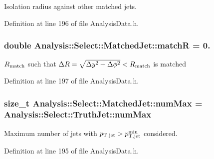 Isolation radius against other matched jets. 



Definition at line 196 of file Analysis\+Data.\+h.

\subsubsection[{\texorpdfstring{matchR}{matchR}}]{\setlength{\rightskip}{0pt plus 5cm}double Analysis\+::\+Select\+::\+Matched\+Jet\+::matchR = 0.\hspace{0.3cm}{\ttfamily [static]}}\hypertarget{namespaceAnalysis_1_1Select_1_1MatchedJet_ad59f2cab2bdc032b32b4ce0321ecfbb1}{}\label{namespaceAnalysis_1_1Select_1_1MatchedJet_ad59f2cab2bdc032b32b4ce0321ecfbb1}


$ R_{\rm match} $ such that $ \Delta R = \sqrt{\Delta y^{2}+\Delta\phi^{2}} < R_{\rm match} $ is matched 



Definition at line 197 of file Analysis\+Data.\+h.

\subsubsection[{\texorpdfstring{num\+Max}{numMax}}]{\setlength{\rightskip}{0pt plus 5cm}size\+\_\+t Analysis\+::\+Select\+::\+Matched\+Jet\+::num\+Max = Analysis\+::\+Select\+::\+Truth\+Jet\+::num\+Max\hspace{0.3cm}{\ttfamily [static]}}\hypertarget{namespaceAnalysis_1_1Select_1_1MatchedJet_afc778d9fb3fb78bc47fe0d1cabbde8ad}{}\label{namespaceAnalysis_1_1Select_1_1MatchedJet_afc778d9fb3fb78bc47fe0d1cabbde8ad}


Maximum number of jets with $ p_{\rm T,jet} > p_{\rm T,jet}^{\rm min} $ considered. 



Definition at line 195 of file Analysis\+Data.\+h.

